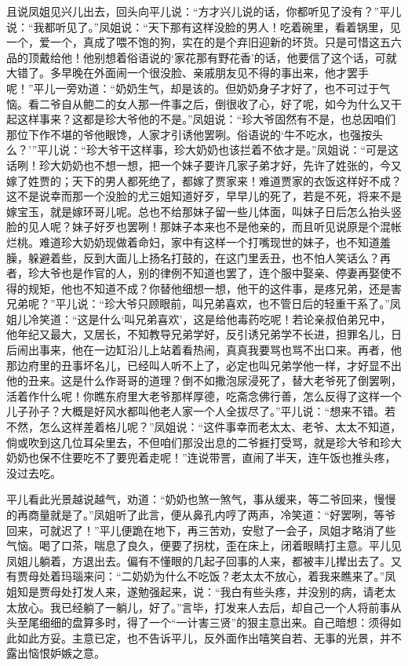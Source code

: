 且说凤姐见兴儿出去，回头向平儿说：“方才兴儿说的话，你都听见了没有？”平儿说：“我都听见了。”凤姐说：“天下那有这样没脸的男人！吃着碗里，看着锅里，见一个，爱一个，真成了喂不饱的狗，实在的是个弃旧迎新的坏货。只是可惜这五六品的顶戴给他！他别想着俗语说的‘家花那有野花香’的话，他要信了这个话，可就大错了。多早晚在外面闹一个很没脸、亲戚朋友见不得的事出来，他才罢手呢！”平儿一旁劝道：“奶奶生气，却是该的。但奶奶身子才好了，也不可过于气恼。看二爷自从鲍二的女人那一件事之后，倒很收了心，好了呢，如今为什么又干起这样事来？这都是珍大爷他的不是。”凤姐说：“珍大爷固然有不是，也总因咱们那位下作不堪的爷他眼馋，人家才引诱他罢咧。俗语说的‘牛不吃水，也强按头么？’”平儿说：“珍大爷干这样事，珍大奶奶也该拦着不依才是。”凤姐说：“可是这话咧！珍大奶奶也不想一想，把一个妹子要许几家子弟才好，先许了姓张的，今又嫁了姓贾的；天下的男人都死绝了，都嫁了贾家来！难道贾家的衣饭这样好不成？这不是说幸而那一个没脸的尤三姐知道好歹，早早儿的死了，若是不死，将来不是嫁宝玉，就是嫁环哥儿呢。总也不给那妹子留一些儿体面，叫妹子日后怎么抬头竖脸的见人呢？妹子好歹也罢咧！那妹子本来也不是他亲的，而且听见说原是个混帐烂桃。难道珍大奶奶现做着命妇，家中有这样一个打嘴现世的妹子，也不知道羞臊，躲避着些，反到大面儿上扬名打鼓的，在这门里丢丑，也不怕人笑话么？再者，珍大爷也是作官的人，别的律例不知道也罢了，连个服中娶亲、停妻再娶使不得的规矩，他也不知道不成？你替他细想一想，他干的这件事，是疼兄弟，还是害兄弟呢？”平儿说：“珍大爷只顾眼前，叫兄弟喜欢，也不管日后的轻重干系了。”凤姐儿冷笑道：“这是什么‘叫兄弟喜欢’，这是给他毒药吃呢！若论亲叔伯弟兄中，他年纪又最大，又居长，不知教导兄弟学好，反引诱兄弟学不长进，担罪名儿，日后闹出事来，他在一边缸沿儿上站着看热闹，真真我要骂也骂不出口来。再者，他那边府里的丑事坏名儿，已经叫人听不上了，必定也叫兄弟学他一样，才好显不出他的丑来。这是什么作哥哥的道理？倒不如撒泡尿浸死了，替大老爷死了倒罢咧，活着作什么呢！你瞧东府里大老爷那样厚德，吃斋念佛行善，怎么反得了这样一个儿子孙子？大概是好风水都叫他老人家一个人全拔尽了。”平儿说：“想来不错。若不然，怎么这样差着格儿呢？”凤姐说：“这件事幸而老太太、老爷、太太不知道，倘或吹到这几位耳朵里去，不但咱们那没出息的二爷捱打受骂，就是珍大爷和珍大奶奶也保不住要吃不了要兜着走呢！”连说带詈，直闹了半天，连午饭也推头疼，没过去吃。

平儿看此光景越说越气，劝道：“奶奶也煞一煞气，事从缓来，等二爷回来，慢慢的再商量就是了。”凤姐听了此言，便从鼻孔内哼了两声，冷笑道：“好罢咧，等爷回来，可就迟了！”平儿便跪在地下，再三苦劝，安慰了一会子，凤姐才略消了些气恼。喝了口茶，喘息了良久，便要了拐枕，歪在床上，闭着眼睛打主意。平儿见凤姐儿躺着，方退出去。偏有不懂眼的几起子回事的人来，都被丰儿撵出去了。又有贾母处着玛瑙来问：“二奶奶为什么不吃饭？老太太不放心，着我来瞧来了。”凤姐知是贾母处打发人来，遂勉强起来，说：“我白有些头疼，并没别的病，请老太太放心。我已经躺了一躺儿，好了。”言毕，打发来人去后，却自己一个人将前事从头至尾细细的盘算多时，得了一个“一计害三贤”的狠主意出来。自己暗想：须得如此如此方妥。主意已定，也不告诉平儿，反外面作出嘻笑自若、无事的光景，并不露出恼恨妒嫉之意。

